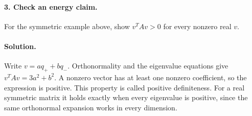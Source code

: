 \paragraph{3. Check an energy claim.}
For the symmetric example above, show $v^TAv>0$ for every nonzero real $v$.

\paragraph{Solution.}
Write $v=aq_++bq_-$. Orthonormality and the eigenvalue equations give
$v^TAv=3a^2+b^2$. A nonzero vector has at least one nonzero coefficient,
so the expression is positive. This property is called positive definiteness.
For a real symmetric matrix it holds exactly when every eigenvalue is
positive, since the same orthonormal expansion works in every dimension.


